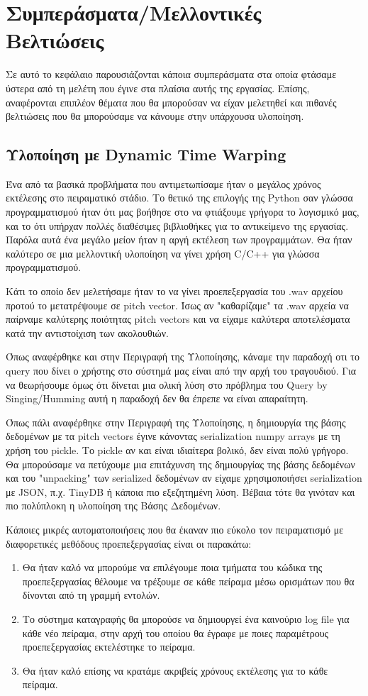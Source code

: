 \section{Συμπεράσματα/Μελλοντικές Βελτιώσεις}
Σε αυτό το κεφάλαιο παρουσιάζονται κάποια συμπεράσματα στα οποία φτάσαμε ύστερα από τη μελέτη που έγινε στα πλαίσια αυτής της εργασίας. Επίσης, αναφέρονται επιπλέον θέματα που θα μπορούσαν να είχαν μελετηθεί 
και πιθανές βελτιώσεις που θα μπορούσαμε να κάνουμε στην υπάρχουσα υλοποίηση.

\subsection{Υλοποίηση με Dynamic Time Warping}
Ένα από τα βασικά προβλήματα που αντιμετωπίσαμε ήταν ο μεγάλος χρόνος εκτέλεσης στο πειραματικό στάδιο. Το θετικό της επιλογής της Python σαν γλώσσα προγραμματισμού ήταν ότι μας βοήθησε στο να φτιάξουμε γρήγορα το λογισμικό μας, και το ότι υπήρχαν πολλές διαθέσιμες βιβλιοθήκες για το αντικείμενο της εργασίας. Παρόλα αυτά ένα μεγάλο μείον ήταν η αργή εκτέλεση των προγραμμάτων. Θα ήταν καλύτερο σε μια μελλοντική υλοποίηση να γίνει χρήση C/C++ για γλώσσα προγραμματισμού.
  
Κάτι το οποίο δεν μελετήσαμε ήταν το να γίνει προεπεξεργασία του .wav αρχείου προτού το μετατρέψουμε σε pitch vector. Ίσως αν "καθαρίζαμε" τα .wav αρχεία να παίρναμε καλύτερης ποιότητας pitch vectors και να είχαμε καλύτερα αποτελέσματα κατά την αντιστοίχιση των ακολουθιών. 

Όπως αναφέρθηκε και στην Περιγραφή της Υλοποίησης, κάναμε την παραδοχή οτι το query που δίνει ο χρήστης στο σύστημά μας είναι από την αρχή του τραγουδιού. Για να θεωρήσουμε όμως ότι δίνεται μια ολική λύση στο πρόβλημα του Query by Singing/Humming αυτή η παραδοχή δεν θα έπρεπε να είναι απαραίτητη.

Όπως πάλι αναφέρθηκε στην Περιγραφή της Υλοποίησης, η δημιουργία της βάσης δεδομένων με τα pitch vectors έγινε κάνοντας serialization numpy arrays με τη χρήση του pickle. Το pickle αν και είναι ιδιαίτερα βολικό, δεν είναι πολύ γρήγορο. Θα μπορούσαμε να πετύχουμε μια επιτάχυνση της δημιουργίας της βάσης δεδομένων και του "unpacking" των serialized δεδομένων αν είχαμε χρησιμοποιήσει serialization με JSON, π.χ. TinyDB \cite{tinydb} ή κάποια πιο εξεζητημένη λύση. Βέβαια τότε θα γινόταν και πιο πολύπλοκη η υλοποίηση της Βάσης Δεδομένων.

Κάποιες μικρές αυτοματοποιήσεις που θα έκαναν πιο εύκολο τον πειραματισμό με διαφορετικές μεθόδους προεπεξεργασίας είναι οι παρακάτω:
\begin{enumerate}
	\item Θα ήταν καλό να μπορούμε να επιλέγουμε ποια τμήματα του κώδικα της προεπεξεργασίας θέλουμε να τρέξουμε σε κάθε πείραμα μέσω ορισμάτων που θα δίνονται από τη γραμμή εντολών.
 	\item Το σύστημα καταγραφής θα μπορούσε να δημιουργεί ένα καινούριο log file για κάθε νέο πείραμα, στην αρχή του οποίου θα έγραφε με ποιες παραμέτρους προεπεξεργασίας εκτελέστηκε το πείραμα.
  \item Θα ήταν καλό επίσης να κρατάμε ακριβείς χρόνους εκτέλεσης για το κάθε πείραμα. 
\end{enumerate} 

